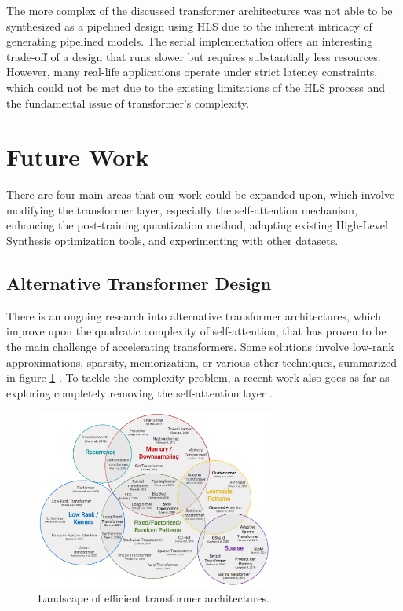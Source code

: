 The more complex of the discussed transformer architectures was not able to be synthesized as a pipelined design using HLS due to the inherent intricacy of generating pipelined models. The serial implementation offers an interesting trade-off of a design that runs slower but requires substantially less resources. However, many real-life applications operate under strict latency constraints, which could not be met due to the existing limitations of the HLS process and the fundamental issue of transformer's complexity.

\section{Future Work}
There are four main areas that our work could be expanded upon, which involve modifying the transformer layer, especially the self-attention mechanism, enhancing the post-training quantization method, adapting existing High-Level Synthesis optimization tools, and experimenting with other datasets.

\subsection{Alternative Transformer Design}
There is an ongoing research into alternative transformer architectures, which improve upon the quadratic complexity of self-attention, that has proven to be the main challenge of accelerating transformers. Some solutions involve low-rank approximations, sparsity, memorization, or various other techniques, summarized in figure \ref{fig:transformer-landscape} \cite{81-tay2020efficient}. To tackle the complexity problem, a recent work also goes as far as exploring completely removing the self-attention layer \cite{82-mikuni2021point}.

\begin{figure}[hpt!]
  \centering
  \includegraphics[trim={0cm 0cm 0cm 0cm}, clip, width=0.7\textwidth, center]{conclusion/transformer_landscape.png}
  \caption{Landscape of efficient transformer architectures.}
  \label{fig:transformer-landscape}
\end{figure}

